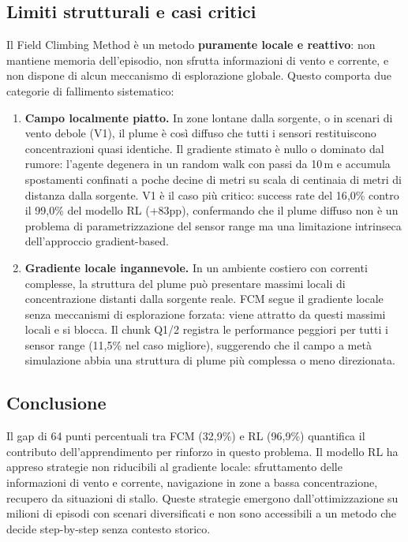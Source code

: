 \documentclass[12pt, a4paper]{article}
\begin{document}
\subsection{Limiti strutturali e casi critici}

Il Field Climbing Method \`e un metodo \textbf{puramente locale e reattivo}:
non mantiene memoria dell'episodio, non sfrutta informazioni di vento e corrente,
e non dispone di alcun meccanismo di esplorazione globale.
Questo comporta due categorie di fallimento sistematico:

\begin{enumerate}
    \item \textbf{Campo localmente piatto.}
    In zone lontane dalla sorgente, o in scenari di vento debole (V1), il plume
    \`e cos\`i diffuso che tutti i sensori restituiscono concentrazioni quasi identiche.
    Il gradiente stimato \`e nullo o dominato dal rumore: l'agente degenera in un
    random walk con passi da 10\,m e accumula spostamenti confinati a poche
    decine di metri su scala di centinaia di metri di distanza dalla sorgente.
    V1 \`e il caso pi\`u critico: success rate del 16{,}0\% contro il 99{,}0\% del modello RL
    (+83pp), confermando che il plume diffuso non \`e un problema di parametrizzazione
    del sensor range ma una limitazione intrinseca dell'approccio gradient-based.

    \item \textbf{Gradiente locale ingannevole.}
    In un ambiente costiero con correnti complesse, la struttura del plume pu\`o
    presentare massimi locali di concentrazione distanti dalla sorgente reale.
    FCM segue il gradiente locale senza meccanismi di esplorazione forzata:
    viene attratto da questi massimi locali e si blocca.
    Il chunk Q1/2 registra le performance peggiori per tutti i sensor range
    (11{,}5\% nel caso migliore), suggerendo che il campo a met\`a simulazione
    abbia una struttura di plume pi\`u complessa o meno direzionata.
\end{enumerate}

\subsection{Conclusione}

Il gap di 64 punti percentuali tra FCM (32{,}9\%) e RL (96{,}9\%) quantifica
il contributo dell'apprendimento per rinforzo in questo problema.
Il modello RL ha appreso strategie non riducibili al gradiente locale: sfruttamento
delle informazioni di vento e corrente, navigazione in zone a bassa concentrazione,
recupero da situazioni di stallo.
Queste strategie emergono dall'ottimizzazione su milioni di episodi con scenari
diversificati e non sono accessibili a un metodo che decide step-by-step
senza contesto storico.
\end{document}

